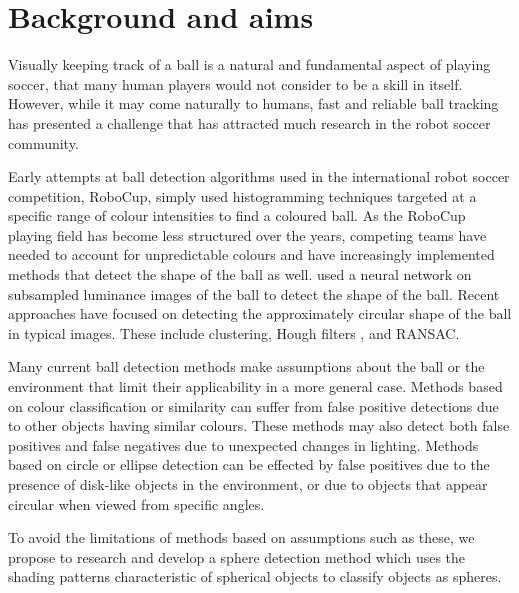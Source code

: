 \documentclass[11pt]{scrartcl}
\begin{document}
	\section{Background and aims} {

  		Visually keeping track of a ball is a natural and fundamental aspect of playing 
  		soccer, that many human players would not consider to be a skill in itself. 
  		However, while it may come naturally to humans, fast and reliable ball
        tracking has presented a challenge that has attracted much research in
        the robot soccer community.

        Early attempts at ball detection algorithms used in the international robot soccer competition,
        RoboCup, simply used histogramming techniques targeted at a specific range of colour intensities to find a coloured ball. As the RoboCup playing field has become less structured over the years, competing teams have needed to account for unpredictable colours and have increasingly implemented methods that detect the shape of the ball as well.
        \citet{schulz2007ball} used a neural network on
        subsampled luminance images of the ball to detect the shape of the 
        ball. Recent approaches have focused on detecting the approximately
        circular shape of the ball in typical images. These include
        clustering, Hough filters \citet{li2013survey}, and RANSAC. 


        Many current ball detection methods make assumptions about the ball or
        the environment that limit their applicability in a more general case. Methods
        based on colour classification or similarity can suffer from false
        positive detections due to other objects having similar colours. These methods may 
        also detect both false positives and false negatives due to unexpected changes
        in lighting. Methods based on circle or ellipse detection can be effected by
        false positives due to the presence of disk-like objects in the
        environment, or due to objects that appear circular when viewed from
        specific angles.

        To avoid the limitations of methods based on assumptions such as
        these, we propose to research and develop a sphere detection method which uses
        the shading patterns characteristic of spherical objects to classify
        objects as spheres.

}
\end{document}
